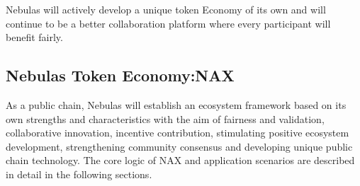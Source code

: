 Nebulas will actively develop a unique token Economy of its own and will continue to be a better collaboration platform where every participant will benefit fairly.

\subsection{Nebulas Token Economy:NAX}
As a public chain, Nebulas will establish an ecosystem framework based on its own strengths and characteristics with the aim of fairness and validation, collaborative innovation, incentive contribution, stimulating positive ecosystem development, strengthening community consensus and developing unique public chain technology. The core logic of NAX and application scenarios are described in detail in the following sections.
